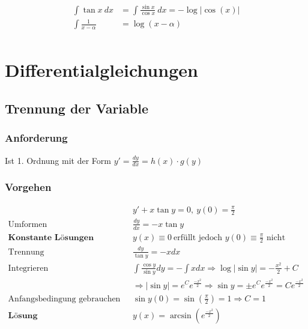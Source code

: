 \documentclass[11pt]{article}
\begin{document}
\begin{equation*}
\begin{split}
	\int\tan x\ dx & = \int\frac{\sin x}{\cos x}\ dx = -\log|\cos(x)| \\
	\int \frac{1}{x - \alpha} & = \log(x-\alpha) \\
\end{split}
\end{equation*}

\section{Differentialgleichungen}

\subsection{Trennung der Variable}

\subsubsection*{Anforderung}

Ist 1. Ordnung mit der Form $y' = \frac{dy}{dx} = h(x) \cdot g(y)$

\subsubsection*{Vorgehen}

\begin{equation*}
\begin{split}
	& y' + x \tan y = 0,\ y(0) = \frac{\pi}{2} \\
	\text{Umformen}\quad & \frac{dy}{dx} = -x \tan y \\
	\textbf{Konstante L{\"o}sungen}\quad & y(x) \equiv 0\ \text{erf{\"u}llt jedoch $y(0) \equiv \frac{\pi}{2}$ nicht} \\
	\text{Trennung}\quad & \frac{dy}{\tan y} = -x dx \\
	\text{Integrieren}\quad & \int\frac{\cos y}{\sin y}dy = - \int xdx \Rightarrow \log|\sin y| = -\frac{x^2}{2} + C \\
	& \Rightarrow |\sin y| = e^Ce^{\frac{-x^2}{2}} \Rightarrow \sin y = \pm e^Ce^{\frac{-x^2}{2}} = Ce^{\frac{-x^2}{2}} \\
	\text{Anfangsbedingung gebrauchen}\quad & \sin y(0) = \sin (\frac{\pi}{2}) = 1 \Rightarrow C = 1 \\
	\textbf{L{\"o}sung}\quad & y(x) = \arcsin (e^{\frac{-x^2}{2}})
\end{split}
\end{equation*}
\end{document}
